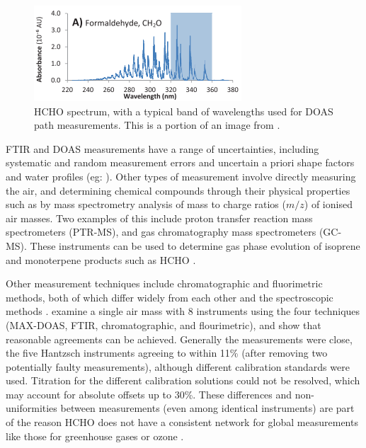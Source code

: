     \begin{figure}
      \includegraphics{Figures/HCHO/HCHOAbsorbanceDavenport.png}
      \caption{ %
        HCHO spectrum, with a typical band of wavelengths used for DOAS path measurements.
        This is a portion of an image from \textcite{Davenport2015}.}
      \label{LR:HCHO:Measurements:fig_HCHOSpectrum}
    \end{figure}
    
    FTIR and DOAS measurements have a range of uncertainties, including systematic and random measurement errors and uncertain a priori shape factors and water profiles (eg: \textcite{Franco2015}).
    Other types of measurement involve directly measuring the air, and determining chemical compounds through their physical properties such as by mass spectrometry analysis of mass to charge ratios ($m/z$) of ionised air masses.
    Two examples of this include proton transfer reaction mass spectrometers (PTR-MS), and gas chromatography mass spectrometers (GC-MS).
    These instruments can be used to determine gas phase evolution of isoprene and monoterpene products such as HCHO \parencite[eg.][]{Lee2006a,Nguyen2014,Wolfe2016,Lerner2017}.
        
    Other measurement techniques include chromatographic and fluorimetric methods, both of which differ widely from each other and the spectroscopic methods \parencite{Hak2005}.
    \textcite{Hak2005} examine a single air mass with 8 instruments using the four techniques (MAX-DOAS, FTIR, chromatographic, and flourimetric), and show that reasonable agreements can be achieved.
    Generally the measurements were close, the five Hantzsch instruments agreeing to within 11\% (after removing two potentially faulty measurements), although different calibration standards were used.
    Titration for the different calibration solutions could not be resolved, which may account for absolute offsets up to 30\%.
    These differences and non-uniformities between measurements (even among identical instruments) are part of the reason HCHO does not have a consistent network for global measurements like those for greenhouse gases or ozone \parencite{FortemsCheiney2012}.
  
